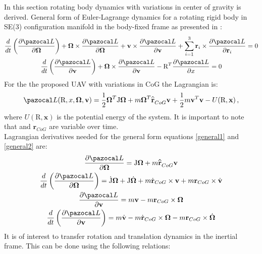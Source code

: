 In this section rotating body dynamics with variations in center of gravity is derived.
General form of Euler-Lagrange dynamics for a rotating rigid body in SE(3) configuration manifold in the body-fixed frame as presented in \cite{LeeModel}:
\begin{gather}
	\frac{d}{dt} \left( \frac{\partial \La}{\partial \mb{\Omega}} \right)
	+ \mb{\Omega} \times \frac{\partial \La}{\partial \mb{\Omega}} 
	+ \textbf{v} \times \frac{\partial \La}{\partial \textbf{v}} 
	+ \sum_{i=1}^{3} \textbf{r}_i \times \frac{\partial \La}{\partial \textbf{r}_i} = 0 \label{general1}\\
	\frac{d}{dt} \left( \frac{\partial \La}{\partial \textbf{v}} \right)
	+ \mb{\Omega} \times \frac{\partial \La}{\partial \textbf{v}} 
	- \text{R}^T \frac{\partial \La}{\partial x} = 0 \label{general2}
\end{gather}
For the the proposed UAV with variations in CoG the Lagrangian is:
\begin{equation}
	\La(\text{R},x,\mb{\Omega},\textbf{v}) = \frac{1}{2}\mb{\Omega}^T\text{J}\mb{\Omega} + m \mb{\Omega}^T \reallywidehat{\textbf{r}}_{CoG}\textbf{v} + \frac{1}{2}m\textbf{v}^T\textbf{v} - U(\text{R},\textbf{x}) \, ,
\end{equation}
where $U(\text{R}, \textbf{x})$ is the potential energy of the system. It is important to note that  and $\textbf{r}_{CoG}$ are variable over time. \\
Lagrangian derivatives needed for the general form equations \ref{general1} and \ref{general2} are:
\begin{gather}
	\frac{\partial \La}{\partial \mb{\Omega}} = \text{J}\mb{\Omega} + m \reallywidehat{\textbf{r}}_{CoG}\textbf{v} \label{d1}\\ 
	\frac{d}{dt} \left( \frac{\partial \La}{\partial \mb{\Omega}} \right) = \dot{\text{J}} \mb{\Omega} + \text{J} \dot{\mb{\Omega}} + m \dot{\textbf{r}}_{CoG} \times \textbf{v} + m \textbf{r}_{CoG} \times \dot{\textbf{v}} \label{d2}\\ 
	\frac{\partial \La}{\partial \textbf{v}} = m\textbf{v} - m\textbf{r}_{CoG} \times \mb{\Omega} \label{d3}\\ 
	\frac{d}{dt} \left( \frac{\partial \La}{\partial \textbf{v}} \right) = m\dot{\textbf{v}} - m\dot{\textbf{r}}_{CoG} \times \mb{\Omega} - m \textbf{r}_{CoG} \times \dot{\mb{\Omega}} \label{d4}
\end{gather}
It is of interest to transfer rotation and translation dynamics in the inertial frame. This can be done using the following relations:
